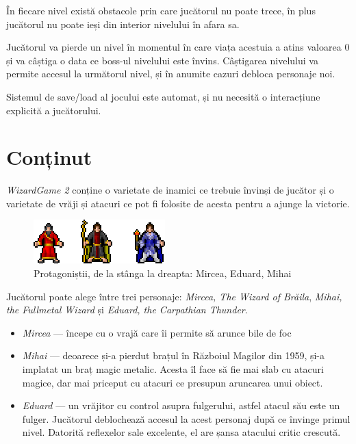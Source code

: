 \documentclass{article}
\begin{document}
    În fiecare nivel există obstacole prin care jucătorul nu poate trece, în plus jucătorul nu
    poate ieși din interior nivelului în afara sa.

    Jucătorul va pierde un nivel în momentul în care viața acestuia a atins valoarea 0 și va
    câștiga o data ce boss-ul nivelului este învins. Câștigarea nivelului va permite accesul la
    următorul nivel, și în anumite cazuri debloca personaje noi.

    Sistemul de save/load al jocului este automat, și nu necesită o interacțiune explicită a
    jucătorului.

    \section{Conținut}
    \label{sec:content}

    \emph{WizardGame 2} conține o varietate de inamici ce trebuie învinși de
    jucător și o varietate de vrăji și atacuri ce pot fi folosite de acesta pentru a ajunge
    la victorie.

    \label{sec:sprites}
    \begin{figure}[h]
        \includegraphics[scale=2]{player-characters}
        \centering
        \caption{Protagoniștii, de la stânga la dreapta: Mircea, Eduard, Mihai}
    \end{figure}

    Jucătorul poate alege între trei personaje: \emph{Mircea, The Wizard of Brăila},
    \emph{Mihai, the Fullmetal Wizard} și \emph{Eduard, the Carpathian Thunder}.
    \begin{itemize}
        \item \emph{Mircea} --- începe cu o vrajă care îi permite să arunce bile de foc
        \item \emph{Mihai} --- deoarece și-a pierdut brațul în Războiul Magilor din 1959,
        și-a implatat un braț magic metalic. Acesta îl face să fie mai slab cu atacuri
        magice, dar mai priceput cu atacuri ce presupun aruncarea unui obiect.
        \item \emph{Eduard} --- un vrăjitor cu control asupra fulgerului, astfel atacul
        său este un fulger. Jucătorul deblochează accesul la acest personaj după ce
        învinge primul nivel. Datorită reflexelor sale excelente, el are șansa atacului critic crescută.
    \end{itemize}
\end{document}
